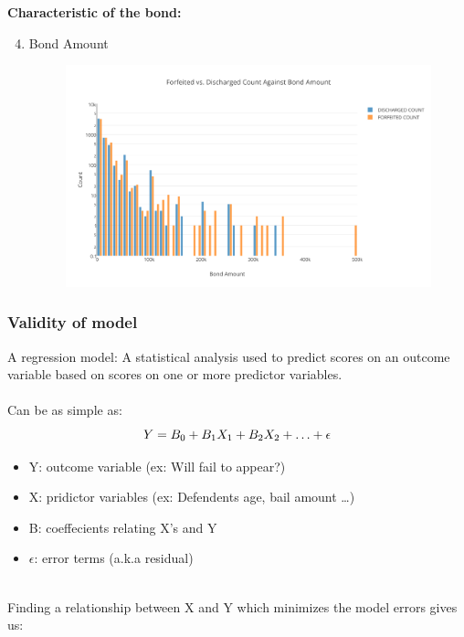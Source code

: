 \documentclass{article}
\begin{document}
\textbf{Characteristic of the bond:}
~\\
\begin{enumerate}
\setcounter{enumi}{3}
\item Bond Amount
\begin{figure}[H]
\centering
\includegraphics[width=0.5\paperwidth]{Forfeited_vs_Discharged_Count_Against_Bond_Amount.png}
\end{figure}
\end{enumerate}

\subsubsection{Validity of model}

A regression model: A statistical analysis used to predict scores on an outcome
variable based on scores on one or more predictor variables.\\
~\\
Can be as simple as:
\begin{equation}
Y = B_{0} + B_{1}X_{1} + B_{2}X_{2} + \ldots + \epsilon \\
\end{equation}
\begin{itemize}
\item Y: outcome variable (ex: Will fail to appear?)
\item X: pridictor variables (ex: Defendents age, bail amount \ldots)
\item B: coeffecients relating X's and Y
\item $\epsilon$: error terms (a.k.a residual)
\end{itemize}
~\\
Finding a relationship between X and Y which minimizes the model errors gives us:
\end{document}

